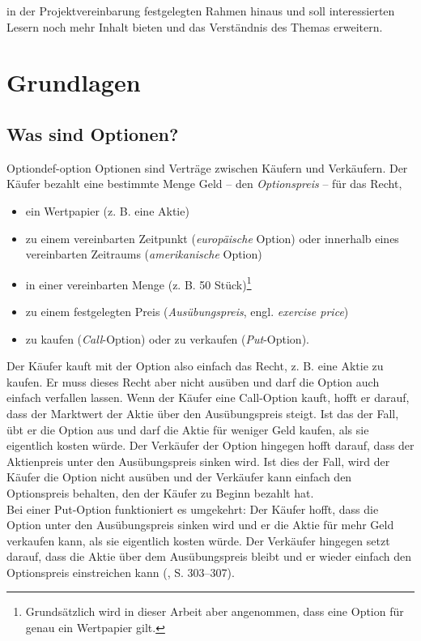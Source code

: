 \documentclass[11pt]{report} %
\begin{document}
in der Projektvereinbarung festgelegten Rahmen hinaus und soll interessierten Lesern noch mehr Inhalt bieten und das Verständnis des Themas erweitern.

\chapter{Grundlagen}
\section{Was sind Optionen?}
\begin{Definition}{Option}{def-option}
    Optionen sind Verträge zwischen Käufern und Verkäufern. Der Käufer bezahlt eine bestimmte Menge Geld -- den \textit{Optionspreis} -- für das Recht,
    \begin{itemize}
        \item ein Wertpapier (z. B. eine Aktie)
        \item zu einem vereinbarten Zeitpunkt (\textit{europäische} Option) oder innerhalb eines vereinbarten Zeitraums (\textit{amerikanische} Option)
        \item in einer vereinbarten Menge (z. B. 50 Stück)\footnote{Grundsätzlich wird in dieser Arbeit aber angenommen, dass eine Option für genau ein Wertpapier gilt.}
        \item zu einem festgelegten Preis (\textit{Ausübungspreis}, engl. \textit{exercise price})
        \item zu kaufen (\textit{Call}-Option) oder zu verkaufen (\textit{Put}-Option).
    \end{itemize}
\end{Definition}

Der Käufer kauft mit der Option also einfach das Recht, z. B. eine Aktie zu kaufen. Er muss dieses Recht aber nicht ausüben und darf die Option auch einfach verfallen lassen. Wenn der Käufer eine Call-Option kauft, hofft er darauf, dass der Marktwert der Aktie über den Ausübungspreis steigt. Ist das der Fall, übt er die Option aus und darf die Aktie für weniger Geld kaufen, als sie eigentlich kosten würde. Der Verkäufer der Option hingegen hofft darauf, dass der Aktienpreis unter den Ausübungspreis sinken wird. Ist dies der Fall, wird der Käufer die Option nicht ausüben und der Verkäufer kann einfach den Optionspreis behalten, den der Käufer zu Beginn bezahlt hat.\\
Bei einer Put-Option funktioniert es umgekehrt: Der Käufer hofft, dass die Option unter den Ausübungspreis sinken wird und er die Aktie für mehr Geld verkaufen kann, als sie eigentlich kosten würde. Der Verkäufer hingegen setzt darauf, dass die Aktie über dem Ausübungspreis bleibt und er wieder einfach den Optionspreis einstreichen kann (\cite{Becker2018}, S. 303--307).
\end{document}
